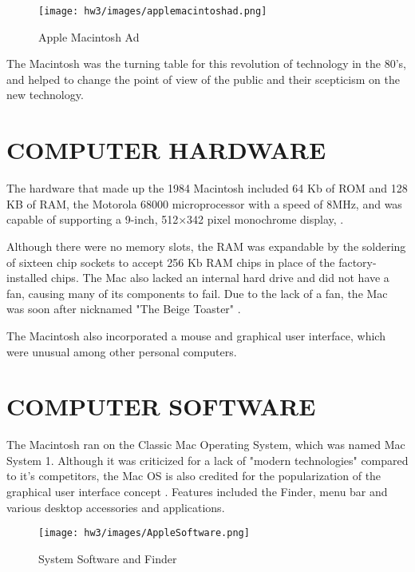 \documentclass[letterpaper, 10 pt, conference]{IEEEconf}
\begin{document}
\begin{figure}[h!]
\centering
\texttt{[image: hw3/images/applemacintoshad.png]}
\caption{Apple Macintosh Ad \cite{MacAd}}
\label{fig:example}
\end{figure}

The Macintosh was the turning table for this revolution of technology in the 80's, and helped to change the point of view of the public and their scepticism on the new technology.


\section{COMPUTER HARDWARE}

The hardware that made up the 1984 Macintosh included 64 Kb of ROM and 128 KB of RAM, the Motorola 68000 microprocessor with a speed of 8MHz, and was capable of supporting a 9-inch, 512×342 pixel monochrome display, \cite{MacHardware}.

Although there were no memory slots, the RAM was expandable by the soldering of sixteen chip sockets to accept 256 Kb RAM chips in place of the factory-installed chips.  The Mac also lacked an internal hard drive and did not have a fan, causing many of its components to fail. Due to the lack of a fan, the Mac was soon after nicknamed "The Beige Toaster" \cite{BeigeToster}.

The Macintosh also incorporated a mouse and graphical user interface, which were unusual among other personal computers.

\section{COMPUTER SOFTWARE}

The Macintosh ran on the Classic Mac Operating System, which was named Mac System 1.  Although it was criticized for a lack of "modern technologies" compared to it's competitors, the Mac OS is also credited for the popularization of the graphical user interface concept \cite{enwiki:1046320952}.  Features included the Finder, menu bar and various desktop accessories and applications.

\begin{figure}[h!]
\centering
\texttt{[image: hw3/images/AppleSoftware.png]}
\caption{System Software and Finder \cite{SoftwarePic}}
\label{fig:example}
\end{figure}
\end{document}
